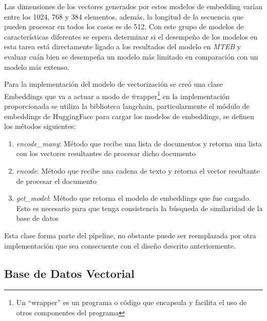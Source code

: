         Las dimensiones de los vectores generados por estos modelos de embedding varían entre los 1024, 768 y 384 elementos, además, la longitud de la secuencia que pueden procesar en todos los casos es de 512. Con este grupo de modelos de características diferentes se espera determinar si el desempeño de los modelos en esta tarea está directamente ligado a los resultados del modelo en \emph{MTEB} y evaluar cuán bien se desempeña un modelo más limitado en comparación con un modelo más extenso.

    Para la implementación del modelo de vectorización se creó una clase Embeddings que va a actuar a modo de \"wrapper\"\footnote{Un “wrapper” es un programa o código que encapsula y facilita el uso de otros componentes del programa} en la implementación proporcionada se utiliza la biblioteca langchain, particularmente el módulo de embeddings de HuggingFace para cargar los modelos de embeddings, se definen los métodos siguientes:
    \begin{enumerate}
        \item \emph{encode_many}: Método que recibe una lista de documentos y retorna una lista con los vectores resultantes de procesar dicho documento
        \item \emph{encode}: Método que recibe una cadena de texto y retorna el vector resultante de procesar el documento 
        \item \emph{get_model}: Método que retorna el modelo de embeddings que fue cargado. Esto es necesario para que tenga consistencia la búsqueda de similaridad de la base de datos
    \end{enumerate}

    Esta clase forma parte del pipeline, no obstante puede ser reemplazada por otra implementación que sea consecuente con el diseño descrito anteriormente.

    \subsection{Base de Datos Vectorial}
